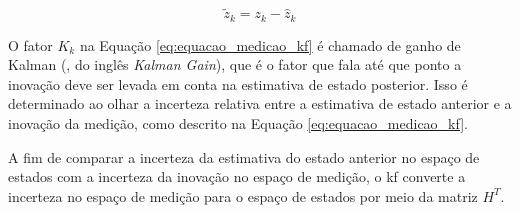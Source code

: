 \documentclass[acronym, symbols, table]{fei}
\begin{document}
				\begin{equation} \label{eq:equacao_inovacao_medicao}
					\tilde{z}_k = z_k - \hat{z}_k
				\end{equation}
				
%				
%			
				
				O fator $K_k$ na Equação \eqref{eq:equacao_medicao_kf} é chamado de ganho de Kalman (, do inglês \textit{Kalman Gain}), que é o fator que fala até que ponto a inovação deve ser levada em conta na estimativa de estado posterior. Isso é determinado ao olhar a incerteza relativa entre a estimativa de estado anterior e a inovação da medição, como descrito na Equação \eqref{eq:equacao_medicao_kf}.
				
				A fim de comparar a incerteza da estimativa do estado anterior no espaço de estados com a incerteza da inovação no espaço de medição, o \acrshort{kf} converte a incerteza no espaço de medição para o espaço de estados por meio da matriz $H^T$.
				
\end{document}
